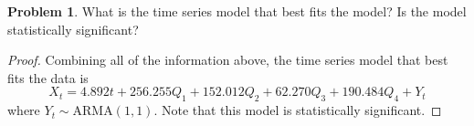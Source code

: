 \documentclass[12pt]{article}
\theoremstyle{definition}
\newtheorem{problem}{Problem}
\begin{document}
\begin{problem}
  What is the time series model that best fits the model? Is the model statistically significant?
\end{problem}

\begin{proof}

Combining all of the information above, the time series model that best fits the data is
\[
  X_t = 4.892t + 256.255Q_1 + 152.012Q_2 + 62.270Q_3 +190.484Q_4 + Y_t
\]
where $Y_t \sim \text{ARMA}(1,1)$. Note that this model is statistically
significant.
\end{proof}
\end{document}
